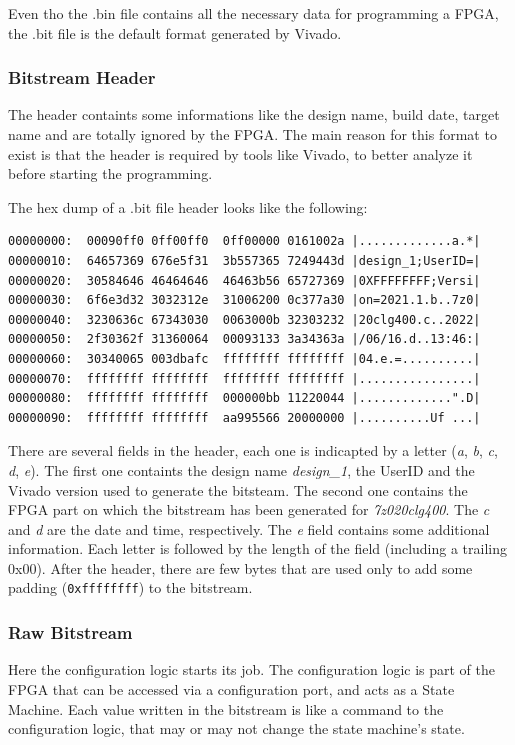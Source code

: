 Even tho the .bin file contains all the necessary data for programming a FPGA, the .bit file is the default format generated by Vivado.

\subsubsection{Bitstream Header}
The header containts some informations like the design name, build date, target name and are totally ignored by the FPGA. The main reason for this format to exist is that the header is required by tools like Vivado, to better analyze it before starting the programming. \bigskip

The hex dump of a .bit file header looks like the following:

\begin{lstlisting}[style=preformatted]
00000000:  00090ff0 0ff00ff0  0ff00000 0161002a |.............a.*|
00000010:  64657369 676e5f31  3b557365 7249443d |design_1;UserID=|
00000020:  30584646 46464646  46463b56 65727369 |0XFFFFFFFF;Versi|
00000030:  6f6e3d32 3032312e  31006200 0c377a30 |on=2021.1.b..7z0|
00000040:  3230636c 67343030  0063000b 32303232 |20clg400.c..2022|
00000050:  2f30362f 31360064  00093133 3a34363a |/06/16.d..13:46:|
00000060:  30340065 003dbafc  ffffffff ffffffff |04.e.=..........|
00000070:  ffffffff ffffffff  ffffffff ffffffff |................|
00000080:  ffffffff ffffffff  000000bb 11220044 |.............".D|
00000090:  ffffffff ffffffff  aa995566 20000000 |..........Uf ...|
\end{lstlisting}

There are several fields in the header, each one is indicapted by a letter (\textit{a}, \textit{b}, \textit{c}, \textit{d}, \textit{e}). The first one containts the design name \textit{design\_1}, the UserID and the Vivado version used to generate the bitsteam. The second one contains the FPGA part on which the bitstream has been generated for \textit{7z020clg400}. The \textit{c} and \textit{d} are the date and time, respectively. The \textit{e} field contains some additional information. Each letter is followed by the length of the field (including a trailing 0x00). After the header, there are few bytes that are used only to add some padding (\texttt{0xffffffff}) to the bitstream. 

\subsubsection{Raw Bitstream}
Here the configuration logic starts its job. The configuration logic is part of the FPGA that can be accessed via a configuration port, and acts as a State Machine. Each value written in the bitstream is like a command to the configuration logic, that may or may not change the state machine's state. \bigskip

